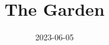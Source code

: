 \documentclass[10pt, twoside]{report}
\begin{document}
\title{The Garden}
\date{2023-06-05}
\maketitle
\shipout\null

\newcommand\chapterColor{MidnightBlue}

\renewcommand\chapterColor{BrickRed}

\renewcommand\chapterColor{RoyalPurple}

\renewcommand\chapterColor{BurntOrange}

\renewcommand\chapterColor{Aquamarine}

\renewcommand\chapterColor{RubineRed}

\renewcommand\chapterColor{MidnightBlue}

\end{document}
